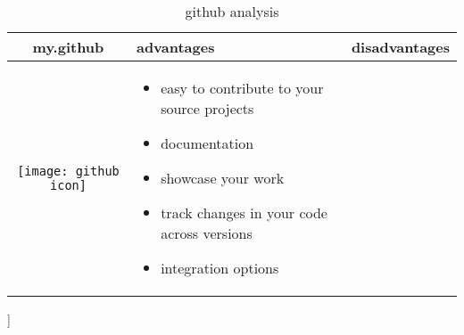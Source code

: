 \documentclass{article}
\begin{document}
	\begin{table}[h!]
\centering
\begin{tabular}{|c|m{5cm}|m{5cm}|}
\hline
my.github & advantages & disadvantages\\ \hline
\begin{minipage}{.4\textwidth}
	\texttt{[image: github icon]}
\end{minipage}
&
\begin{itemize}
	\item easy to contribute to your source projects
	\item documentation
	\item showcase your work
	\item track changes in your code across versions
	\item integration options
\end{itemize}
\\ \hline\end{tabular}\caption{github analysis}\label{tbl:mygithub}
\end{table}


			
				
		
		
	]
\end{document}
